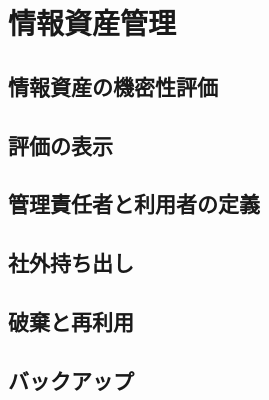 \chapter{情報資産管理}
\section{情報資産の機密性評価}
\section{評価の表示}
\section{管理責任者と利用者の定義}
\section{社外持ち出し}
\section{破棄と再利用}
\section{バックアップ}